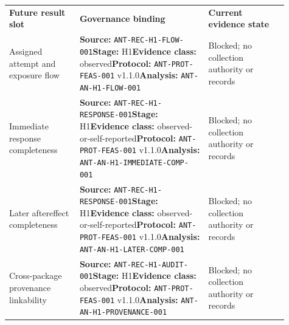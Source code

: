 \small
\begin{tabular}{@{}>{\raggedright\arraybackslash}p{0.23\linewidth}>{\raggedright\arraybackslash}p{0.42\linewidth}>{\raggedright\arraybackslash}p{0.26\linewidth}@{}}
\toprule
\multicolumn{3}{@{}l}{\textbf{GOVERNED EMPTY STATE --- ANT-TBL-005}} \\
\midrule
\textbf{Future result slot} & \textbf{Governance binding} & \textbf{Current evidence state} \\
\midrule
Assigned attempt and exposure flow & {\scriptsize\textbf{Source:} \nolinkurl{ANT-REC-H1-FLOW-001}\newline \textbf{Stage:} H1\newline\textbf{Evidence class:} observed\newline\textbf{Protocol:} \nolinkurl{ANT-PROT-FEAS-001} v1.1.0\newline\textbf{Analysis:} \nolinkurl{ANT-AN-H1-FLOW-001}} & Blocked; no collection authority or records \\
\addlinespace[0.25em]
Immediate response completeness & {\scriptsize\textbf{Source:} \nolinkurl{ANT-REC-H1-RESPONSE-001}\newline \textbf{Stage:} H1\newline\textbf{Evidence class:} observed-or-self-reported\newline\textbf{Protocol:} \nolinkurl{ANT-PROT-FEAS-001} v1.1.0\newline\textbf{Analysis:} \nolinkurl{ANT-AN-H1-IMMEDIATE-COMP-001}} & Blocked; no collection authority or records \\
\addlinespace[0.25em]
Later aftereffect completeness & {\scriptsize\textbf{Source:} \nolinkurl{ANT-REC-H1-RESPONSE-001}\newline \textbf{Stage:} H1\newline\textbf{Evidence class:} observed-or-self-reported\newline\textbf{Protocol:} \nolinkurl{ANT-PROT-FEAS-001} v1.1.0\newline\textbf{Analysis:} \nolinkurl{ANT-AN-H1-LATER-COMP-001}} & Blocked; no collection authority or records \\
\addlinespace[0.25em]
Cross-package provenance linkability & {\scriptsize\textbf{Source:} \nolinkurl{ANT-REC-H1-AUDIT-001}\newline \textbf{Stage:} H1\newline\textbf{Evidence class:} observed\newline\textbf{Protocol:} \nolinkurl{ANT-PROT-FEAS-001} v1.1.0\newline\textbf{Analysis:} \nolinkurl{ANT-AN-H1-PROVENANCE-001}} & Blocked; no collection authority or records \\

\end{tabular}
